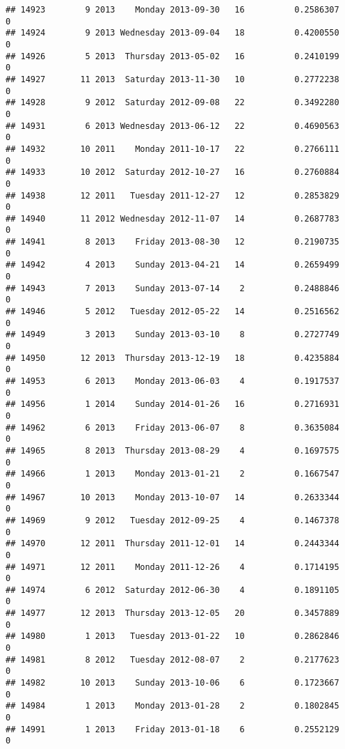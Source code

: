\documentclass[
]{article}
\begin{document}
\begin{verbatim}
## 14923        9 2013    Monday 2013-09-30   16          0.2586307             0
## 14924        9 2013 Wednesday 2013-09-04   18          0.4200550             0
## 14926        5 2013  Thursday 2013-05-02   16          0.2410199             0
## 14927       11 2013  Saturday 2013-11-30   10          0.2772238             0
## 14928        9 2012  Saturday 2012-09-08   22          0.3492280             0
## 14931        6 2013 Wednesday 2013-06-12   22          0.4690563             0
## 14932       10 2011    Monday 2011-10-17   22          0.2766111             0
## 14933       10 2012  Saturday 2012-10-27   16          0.2760884             0
## 14938       12 2011   Tuesday 2011-12-27   12          0.2853829             0
## 14940       11 2012 Wednesday 2012-11-07   14          0.2687783             0
## 14941        8 2013    Friday 2013-08-30   12          0.2190735             0
## 14942        4 2013    Sunday 2013-04-21   14          0.2659499             0
## 14943        7 2013    Sunday 2013-07-14    2          0.2488846             0
## 14946        5 2012   Tuesday 2012-05-22   14          0.2516562             0
## 14949        3 2013    Sunday 2013-03-10    8          0.2727749             0
## 14950       12 2013  Thursday 2013-12-19   18          0.4235884             0
## 14953        6 2013    Monday 2013-06-03    4          0.1917537             0
## 14956        1 2014    Sunday 2014-01-26   16          0.2716931             0
## 14962        6 2013    Friday 2013-06-07    8          0.3635084             0
## 14965        8 2013  Thursday 2013-08-29    4          0.1697575             0
## 14966        1 2013    Monday 2013-01-21    2          0.1667547             0
## 14967       10 2013    Monday 2013-10-07   14          0.2633344             0
## 14969        9 2012   Tuesday 2012-09-25    4          0.1467378             0
## 14970       12 2011  Thursday 2011-12-01   14          0.2443344             0
## 14971       12 2011    Monday 2011-12-26    4          0.1714195             0
## 14974        6 2012  Saturday 2012-06-30    4          0.1891105             0
## 14977       12 2013  Thursday 2013-12-05   20          0.3457889             0
## 14980        1 2013   Tuesday 2013-01-22   10          0.2862846             0
## 14981        8 2012   Tuesday 2012-08-07    2          0.2177623             0
## 14982       10 2013    Sunday 2013-10-06    6          0.1723667             0
## 14984        1 2013    Monday 2013-01-28    2          0.1802845             0
## 14991        1 2013    Friday 2013-01-18    6          0.2552129             0

\end{verbatim}
\end{document}
